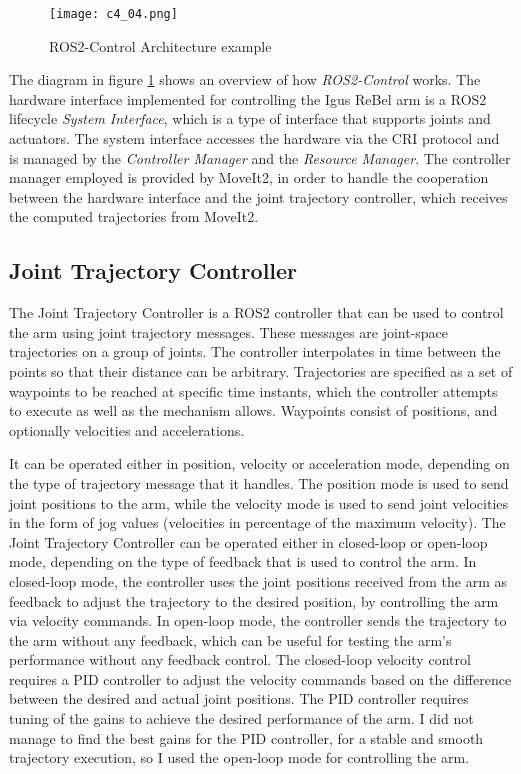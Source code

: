 \begin{figure}[t]
    \centering
    \texttt{[image: c4\_04.png]}
    \caption{ROS2-Control Architecture example}
    \label{fig:ros2control}
\end{figure}

The diagram in figure \ref{fig:ros2control} shows an overview of how \textit{ROS2-Control} works.
The hardware interface implemented for controlling the Igus ReBel arm is a ROS2 lifecycle \textit{System Interface},
which is a type of interface that supports joints and actuators. The system interface accesses the hardware
via the CRI protocol and is managed by the \textit{Controller Manager} and the \textit{Resource Manager}. The
controller manager employed is provided by MoveIt2, in order to handle the cooperation between the hardware
interface and the joint trajectory controller, which receives the computed trajectories from MoveIt2.

\subsection{Joint Trajectory Controller}

The Joint Trajectory Controller is a ROS2 controller that can be used to control the arm using joint trajectory messages.
These messages are joint-space trajectories on a group of joints.
The controller interpolates in time between the points so that their distance can be arbitrary. 
Trajectories are specified as a set of waypoints to be reached at specific time instants, which the controller 
attempts to execute as well as the mechanism allows. Waypoints consist of positions, and optionally velocities and accelerations.

It can be operated either in position, velocity or acceleration mode, depending on the type of trajectory message
that it handles.
The position mode is used to send joint positions to the arm, while the velocity mode is used to send joint velocities
in the form of jog values (velocities in percentage of the maximum velocity). The Joint Trajectory Controller can
be operated either in closed-loop or open-loop mode, depending on the type of feedback that is used to control the arm.
In closed-loop mode, the controller uses the joint positions received from the arm as feedback to adjust the trajectory
to the desired position, by controlling the arm via velocity commands. In open-loop mode, the controller sends the
trajectory to the arm without any feedback, which can be useful for testing the arm's performance without any feedback
control. The closed-loop velocity control requires a PID controller to adjust the velocity commands based on the
difference between the desired and actual joint positions. The PID controller requires tuning of the gains to
achieve the desired performance of the arm. I did not manage to find the best gains for the PID controller,
for a stable and smooth trajectory execution, so I used the open-loop mode for controlling the arm.

